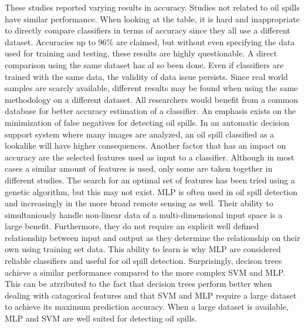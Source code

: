 These studies reported varying results in accuracy. Studies not related to oil spills have similar performance. When looking at the table, it is hard and inappropriate to directly compare classifiers in terms of accuracy since they all use a different dataset. Accuracies up to 96\% are claimed\cite{Topouzelis200924}, but without even specifying the data used for training and testing, these results are highly questionable. A direct comparison using the same dataset has al so been done\cite{Mera201472}\cite{Xu201414}. Even if classifiers are trained with the same data, the validity of data issue persists. Since real world samples are scarcly available, different results may be found when using the same methodology on a different dataset. All researchers would benefit from a common database for better accuracy estimation of a classifier\cite{Topouzelis200810}. An emphasis exists on the minimization of false negatives for detecting oil spills. In an automatic decision support system where many images are analyzed, an oil spill classified as a lookalike will have higher consequences. Another factor that has an impact on accuracy are the selected features used as input to a classifier. Although in most cases a similar amount of features is used, only some are taken together in different studies. The search for an optimal set of features has been tried using a genetic algorithm\cite{Topouzelis200930}, but this may not exist.
MLP is often used in oil spill detection and increasingly in the more broad remote sensing as well. Their ability to simultaniously handle non-linear data of a multi-dimensional input space is a large benefit. Furthermore, they do not require an explicit well defined relationship between input and output as they determine the relationship on their own using training set data. This ability to learn is why MLP are considered reliable classifiers and useful for oil spill detection\cite{Delfrate200038}. Surprisingly, decison trees achieve a similar performance compared to the more complex SVM and MLP. This can be atrributed to the fact that decision trees perform better when dealing with catagorical features and that SVM and MLP require a large dataset to achieve its maximum prediction accuracy\cite{kotsiantis2007supervised}. When a large dataset is available, MLP and SVM are well suited for detecting oil spills.

